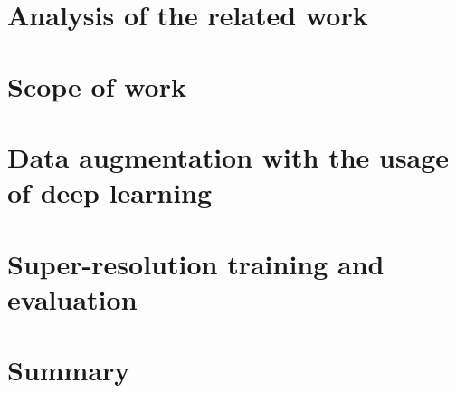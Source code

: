 \documentclass[a4paper, openright, twoside, 12pt]{report}
\begin{document}
\chapter{Analysis of the related work}
\label{ch:analysis}


\chapter{Scope of work}
\label{ch:scope}


\chapter{Data augmentation with the usage of deep learning}
\label{ch:augmentation}


\chapter{Super-resolution training and evaluation}
\label{ch:sr-evaluation}


\chapter{Summary}
\label{ch:summary}


\begin{appendices}
    
\end{appendices}


\printglossary[type=\acronymtype]

\listoffigures
\listoftables
\listofalgorithms
\listoflistings



\end{document}
